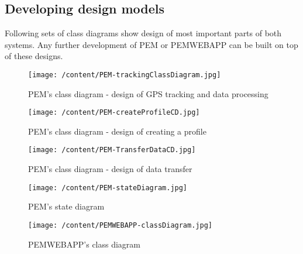 \documentclass[12pt, a4paper]{report}   %
\begin{document}
\begin{enumerate}
\subsection{Developing design models}
Following sets of class diagrams show design of most important parts of both systems. Any further development of PEM or PEMWEBAPP can be built on top of these designs.
 

\begin{figure}[H]
\begin{sideways}
\begin{minipage}{19cm}
	\texttt{[image: /content/PEM-trackingClassDiagram.jpg]}
	\caption{PEM's class diagram - design of GPS tracking and data processing}
\end{minipage}
\end{sideways}
\centering
\end{figure}


\begin{figure}[H]
\begin{sideways}
\begin{minipage}{19cm}
	\texttt{[image: /content/PEM-createProfileCD.jpg]}
	\caption{PEM's class diagram - design of creating a profile}
\end{minipage}
\end{sideways}
\centering
\end{figure}


\begin{figure}[H]
\begin{sideways}
\begin{minipage}{19cm}
	\texttt{[image: /content/PEM-TransferDataCD.jpg]}
	\caption{PEM's class diagram - design of data transfer}
\end{minipage}
\end{sideways}
\centering
\end{figure}


\begin{figure}[H]
\begin{sideways}
\begin{minipage}{19cm}
	\texttt{[image: /content/PEM-stateDiagram.jpg]}
	\caption{PEM's state diagram}
\end{minipage}
\end{sideways}
\centering
\end{figure}


\begin{figure}[H]
\begin{sideways}
\begin{minipage}{19cm}
	\texttt{[image: /content/PEMWEBAPP-classDiagram.jpg]}
\end{minipage}
\end{sideways}
\centering
\caption{PEMWEBAPP's class diagram}
\end{figure}



\end{enumerate}
\end{document}

